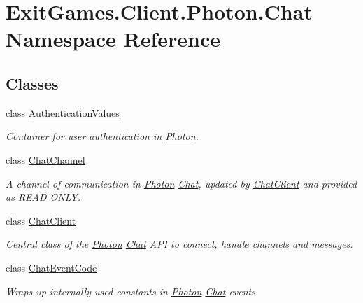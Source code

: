 \hypertarget{namespace_exit_games_1_1_client_1_1_photon_1_1_chat}{}\section{Exit\+Games.\+Client.\+Photon.\+Chat Namespace Reference}
\label{namespace_exit_games_1_1_client_1_1_photon_1_1_chat}
\subsection*{Classes}
\begin{DoxyCompactItemize}
\item 
class \hyperlink{class_exit_games_1_1_client_1_1_photon_1_1_chat_1_1_authentication_values}{Authentication\+Values}
\begin{DoxyCompactList}\small\item\em Container for user authentication in \hyperlink{namespace_exit_games_1_1_client_1_1_photon}{Photon}. \end{DoxyCompactList}\item 
class \hyperlink{class_exit_games_1_1_client_1_1_photon_1_1_chat_1_1_chat_channel}{Chat\+Channel}
\begin{DoxyCompactList}\small\item\em A channel of communication in \hyperlink{namespace_exit_games_1_1_client_1_1_photon}{Photon} \hyperlink{namespace_exit_games_1_1_client_1_1_photon_1_1_chat}{Chat}, updated by \hyperlink{class_exit_games_1_1_client_1_1_photon_1_1_chat_1_1_chat_client}{Chat\+Client} and provided as R\+E\+AD O\+N\+LY. \end{DoxyCompactList}\item 
class \hyperlink{class_exit_games_1_1_client_1_1_photon_1_1_chat_1_1_chat_client}{Chat\+Client}
\begin{DoxyCompactList}\small\item\em Central class of the \hyperlink{namespace_exit_games_1_1_client_1_1_photon}{Photon} \hyperlink{namespace_exit_games_1_1_client_1_1_photon_1_1_chat}{Chat} A\+PI to connect, handle channels and messages. \end{DoxyCompactList}\item 
class \hyperlink{class_exit_games_1_1_client_1_1_photon_1_1_chat_1_1_chat_event_code}{Chat\+Event\+Code}
\begin{DoxyCompactList}\small\item\em Wraps up internally used constants in \hyperlink{namespace_exit_games_1_1_client_1_1_photon}{Photon} \hyperlink{namespace_exit_games_1_1_client_1_1_photon_1_1_chat}{Chat} events. \end{DoxyCompactList}\item 

\end{DoxyCompactItemize}
